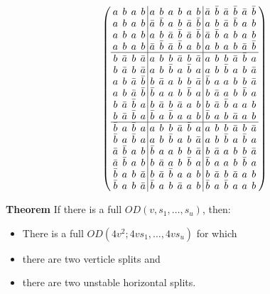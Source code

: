 \documentclass{beamer}
\begin{document}
\begin{frame}

  \[
    \arraycolsep=2.0pt\def\arraystretch{0.75}
    \left(
      \begin{array}{cccc|cccccc|cccccc}
        a&b&a&b&a&b&a&b&a&b&\bar{a}&\bar{b}&\bar{a}&\bar{b}&\bar{a}&\bar{b}\\
        a&b&a&b&\bar{a}&\bar{b}&a&b&\bar{a}&\bar{b}&a&b&\bar{a}&\bar{b}&a&b\\
        a&b&a&b&a&b&\bar{a}&\bar{b}&\bar{a}&\bar{b}&\bar{a}&\bar{b}&a&b&a&b\\
        a&b&a&b&\bar{a}&\bar{b}&\bar{a}&\bar{b}&a&b&a&b&a&b&\bar{a}&\bar{b}\\\hline
        b&\bar{a}&b&\bar{a}&a&b&b&\bar{a}&b&\bar{a}&a&b&b&\bar{a}&\bar{b}&a\\
        b&\bar{a}&b&\bar{a}&a&b&\bar{b}&a&\bar{b}&a&a&b&\bar{b}&a&b&\bar{a}\\
        a&b&\bar{a}&\bar{b}&b&\bar{a}&a&b&b&\bar{a}&\bar{b}&a&a&b&b&\bar{a}\\
        a&b&\bar{a}&\bar{b}&\bar{b}&a&a&b&\bar{b}&a&b&\bar{a}&a&b&\bar{b}&a\\
        b&\bar{a}&\bar{b}&a&b&\bar{a}&b&\bar{a}&a&b&b&\bar{a}&\bar{b}&a&a&b\\
        b&\bar{a}&\bar{b}&a&\bar{b}&a&\bar{b}&a&a&b&\bar{b}&a&b&\bar{a}&a&b\\\hline
        \bar{b}&a&\bar{b}&a&a&b&b&\bar{a}&\bar{b}&a&a&b&b&\bar{a}&b&\bar{a}\\
        \bar{b}&a&\bar{b}&a&a&b&\bar{b}&a&b&\bar{a}&a&b&\bar{b}&a&\bar{b}&a\\
        \bar{a}&\bar{b}&a&b&\bar{b}&a&a&b&b&\bar{a}&b&\bar{a}&a&b&b&\bar{a}\\
        \bar{a}&\bar{b}&a&b&b&\bar{a}&a&b&\bar{b}&a&\bar{b}&a&a&b&\bar{b}&a\\
        \bar{b}&a&b&\bar{a}&b&\bar{a}&\bar{b}&a&a&b&b&\bar{a}&b&\bar{a}&a&b\\
        \bar{b}&a&b&\bar{a}&\bar{b}&a&b&\bar{a}&a&b&\bar{b}&a&\bar{b}&a&a&b\\
      \end{array}
    \right)
  \]
  
\end{frame}

\begin{frame}

  \begin{block}{{\bf Theorem} \cite[][]{split-od}}
    If there is a full $OD(v,s_1,\dots,s_u)$, then:
    \begin{itemize}
    \item There is a full $OD(4v^2; 4vs_1, \dots, 4vs_u)$ for which
    \item there are two verticle splits and
    \item there are two unstable horizontal splits.
    \end{itemize}
  \end{block}
  
\end{frame}
\end{document}
